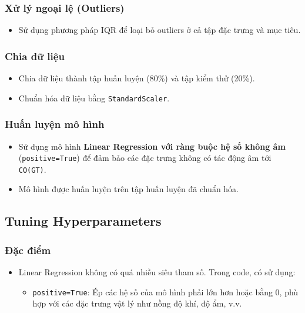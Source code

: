 \subsubsection{Xử lý ngoại lệ (Outliers)}
\begin{itemize}
    \item Sử dụng phương pháp IQR để loại bỏ outliers ở cả tập đặc trưng và mục tiêu.
\end{itemize}

\subsubsection{Chia dữ liệu}
\begin{itemize}
    \item Chia dữ liệu thành tập huấn luyện (80\%) và tập kiểm thử (20\%).
    \item Chuẩn hóa dữ liệu bằng \texttt{StandardScaler}.
\end{itemize}

\subsubsection{Huấn luyện mô hình}
\begin{itemize}
    \item Sử dụng mô hình \textbf{Linear Regression với ràng buộc hệ số không âm} (\texttt{positive=True}) để đảm bảo các đặc trưng không có tác động âm tới \texttt{CO(GT)}.
    \item Mô hình được huấn luyện trên tập huấn luyện đã chuẩn hóa.
\end{itemize}

\subsection{Tuning Hyperparameters}

\subsubsection{Đặc điểm}
\begin{itemize}
    \item Linear Regression không có quá nhiều siêu tham số. Trong code, có sử dụng:
    \begin{itemize}
        \item \texttt{positive=True}: Ép các hệ số của mô hình phải lớn hơn hoặc bằng 0, phù hợp với các đặc trưng vật lý như nồng độ khí, độ ẩm, v.v.
    \end{itemize}
\end{itemize}

